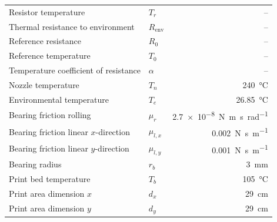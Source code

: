 \begin{table}[H]
\begin{tabular}{llr}
    Resistor temperature              & $T_r$           & -- \\
    Thermal resistance to environment & $R_{\mathrm{env}}$ & -- \\
    Reference resistance              & $R_0$           & -- \\
    Reference temperature             & $T_0$           & -- \\
    Temperature coefficient of resistance & $\alpha$    & -- \\
    Nozzle temperature                & $T_n$           & \qty{240}{\degreeCelsius} \\
    Environmental temperature         & $T_e$           & \qty{26.85}{\degreeCelsius} \\
    \midrule
    Bearing friction rolling          & $\mu_r$         & \qty{2.7e-8}{\newton\metre\second\per\radian} \\
    Bearing friction linear $x$-direction & $\mu_{l,x}$ & \qty{0.002}{\newton\second\per\metre} \\
    Bearing friction linear $y$-direction & $\mu_{l,y}$ & \qty{0.001}{\newton\second\per\metre} \\
    Bearing radius                        & $r_b$       & \qty{3}{\milli\metre} \\
    \midrule
    Print bed temperature             & $T_b$           & \qty{105}{\degreeCelsius} \\
    Print area dimension $x$          & $d_x$           & \qty{29}{\centi\metre} \\
    Print area dimension $y$          & $d_y$           & \qty{29}{\centi\metre} \\
    \bottomrule
  \end{tabular}
\end{table}
